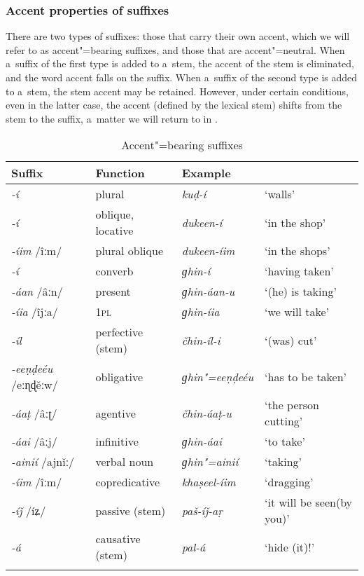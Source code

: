 \subsubsection*{Accent properties of suffixes}

There are two types of suffixes: those that carry their own accent, which we will refer to as
accent"=bearing suffixes, and those that are accent"=neutral. When a~suffix of the first type is added
to a~stem, the accent of the stem is eliminated, and the word accent falls on the suffix. When
a~suffix of the second type is added to a~stem, the stem accent may be retained. However, under
certain conditions, even in the latter case, the accent (defined by the lexical stem) shifts from
the stem to the suffix, a~matter we will return to in .

\begin{table}[ht]
\caption{Accent"=bearing suffixes}
\begin{tabularx}{\textwidth}{ l l l Q }
\lsptoprule
Suffix &
Function &
Example &
\\\hline
\textit{-í} &
plural &
\textit{kuḍ-í} &
`walls'\\
\textit{-í} &
oblique, locative &
\textit{dukeen-í} &
`in the shop'\\
\textit{-íim} /îːm/ &
plural oblique &
\textit{dukeen-íim} &
`in the shops'\\
\textit{-í} &
converb &
\textit{ɡhin-í} &
`having taken'\\
\textit{-áan} /âːn/ &
present &
\textit{ɡhin-áan-u} &
`(he) is taking'\\
\textit{-íia} /îjːa/ &
\textsc{1pl} &
\textit{ɡhin-íia} &
`we will take'\\
\textit{-íl} &
perfective (stem) &
\textit{čhin-íl-i} &
`(was) cut'\\
\textit{-eeṇḍeéu} /eːɳɖěːw/ &
obligative &
\textit{ɡhin"=eeṇḍeéu} &
`has to be taken'\\
\textit{-áaṭ} /âːʈ/ &
agentive &
\textit{čhin-áaṭ-u} &
`the person cutting'\\
\textit{-áai} /âːj/ &
infinitive &
\textit{ɡhin-áai} &
`to take'\\
\textit{-ainií} /ajnǐː/ &
verbal noun &
\textit{ɡhin"=ainií} &
`taking'\\
\textit{-íim} /îːm/ &
copredicative &
\textit{khaṣeel-íim} &
`dragging'\\
\textit{-íǰ} /íʑ/ &
passive (stem) &
\textit{paš-íǰ-aṛ} &
`it will be seen\newline (by you)'\\
\textit{-á} &
causative (stem) &
\textit{pal-á} &
`hide (it)!'\\\lspbottomrule
\end{tabularx}
\label{tab:3-5}
\end{table}


